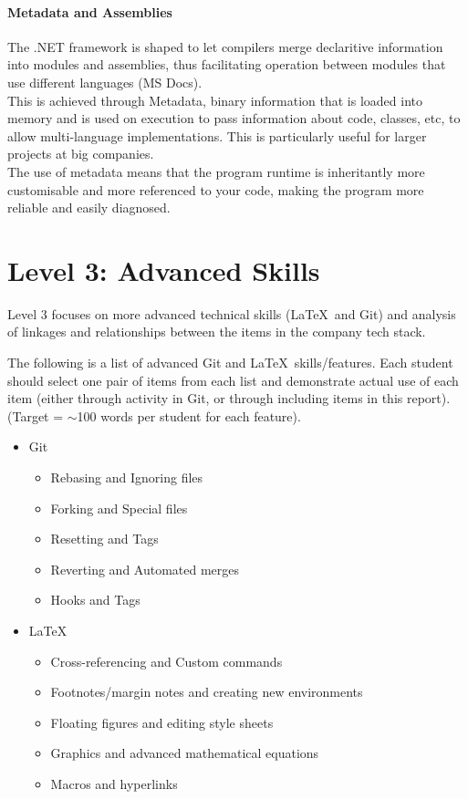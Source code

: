\documentclass[a4paper, 11pt]{report}
\begin{document}
	\paragraph{Metadata and Assemblies} The .NET framework is shaped to let compilers merge declaritive information into modules and assemblies, thus facilitating operation between modules that use different languages (MS Docs).
	\\This is achieved through Metadata, binary information that is loaded into memory and is used on execution to pass information about code, classes, etc, to allow multi-language implementations. This is particularly useful for larger projects at big companies.
	\\The use of metadata means that the program runtime is inheritantly more customisable and more referenced to your code, making the program more reliable and easily diagnosed.



	\newpage
	\section{Level 3: Advanced Skills}

	Level 3 focuses on more advanced technical skills (\LaTeX\ and Git) and analysis of linkages and relationships between the items in the company tech stack.

	The following is a list of advanced Git and \LaTeX\ skills/features. Each student should select one pair of items from each list and demonstrate actual use of each item (either through activity in Git, or through including items in this report). (Target = $\sim$100 words per student for each feature).
	\begin{itemize}
		\item Git
		\begin{itemize}
			\item Rebasing and Ignoring files
			\item Forking and Special files
			\item Resetting and Tags
			\item Reverting and Automated merges
			\item Hooks and Tags
		\end{itemize}
		\item \LaTeX\
		\begin{itemize}
			\item Cross-referencing and Custom commands
			\item Footnotes/margin notes and creating new environments
			\item Floating figures and editing style sheets
			\item Graphics and advanced mathematical equations
			\item Macros and hyperlinks
		\end{itemize}
	\end{itemize}
\end{document}
